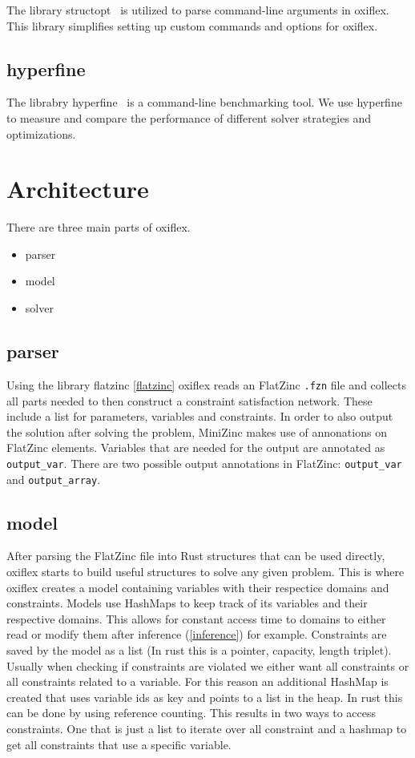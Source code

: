 The library structopt~\cite{structopt:2020} is utilized to parse command-line arguments in oxiflex. This library simplifies setting up custom commands and options for oxiflex.

\subsection{hyperfine}

The librabry hyperfine~\cite{hyperfine:2023} is a command-line benchmarking tool. We use hyperfine to measure and compare the performance of different solver strategies and optimizations.

\section{Architecture}

There are three main parts of oxiflex.

\begin{itemize}
	\item parser
	\item model
	\item solver
\end{itemize}

\subsection{parser}

Using the library flatzinc \ref{flatzinc} oxiflex reads an FlatZinc \verb|.fzn| file and collects all parts needed to then construct a constraint satisfaction network. These include a list for parameters, variables and constraints. In order to also output the solution after solving the problem, MiniZinc makes use of annonations on FlatZinc elements. Variables that are needed for the output are annotated as \verb|output_var|. There are two possible output annotations in FlatZinc: \verb|output_var| and \verb|output_array|.

\subsection{model}

After parsing the FlatZinc file into Rust structures that can be used directly, oxiflex starts to build useful structures  to solve any given problem. This is where oxiflex creates a model containing variables with their respectice domains and constraints. Models use HashMaps to keep track of its variables and their respective domains. This allows for constant access time to domains to either read or modify them after inference (\ref{inference}) for example. Constraints are saved by the model as a list (In rust this is a pointer, capacity, length triplet). Usually when checking if constraints are violated we either want all constraints or all constraints related to a variable. For this reason an additional HashMap is created that uses variable ids as key and points to a list in the heap. In rust this can be done by using reference counting. This results in two ways to access constraints. One that is just a list to iterate over all constraint and a hashmap to get all constraints that use a specific variable.

